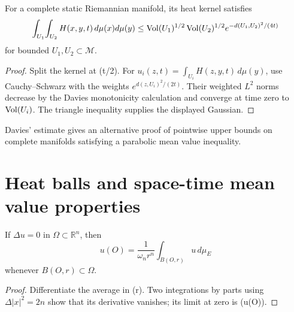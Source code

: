 \begin{theorem}
\label{thm:chow-iii-davies-double-integral-upper-bound}


For a complete static Riemannian manifold, its heat kernel satisfies
\[
 \int_{U_1}\!\int_{U_2}H(x,y,t)\,d\mu(x)d\mu(y)
 \le \operatorname{Vol}(U_1)^{1/2}\operatorname{Vol}(U_2)^{1/2}
 e^{-d(U_1,U_2)^2/(4t)}
\]
for bounded \(U_1,U_2\subset\mathcal M\).
\end{theorem}
\begin{proof}
\sketch Split the kernel at (t/2).  For
\(u_i(z,t)=\int_{U_i}H(z,y,t)\,d\mu(y)\), use Cauchy--Schwarz with the
weights \(e^{d(z,U_i)^2/(2t)}\).  Their weighted \(L^2\) norms decrease by
the Davies monotonicity calculation and converge at time zero to
\(\operatorname{Vol}(U_i)\).  The triangle inequality supplies the displayed Gaussian.
\end{proof}

\begin{remark}
\label{rem:chow-iii-davies-estimate-pointwise-use}


Davies' estimate gives an alternative proof of pointwise upper bounds on
complete manifolds satisfying a parabolic mean value inequality.
\end{remark}

\section{Heat balls and space-time mean value properties}

\begin{theorem}
\label{thm:chow-iii-euclidean-harmonic-mean-value-property}

If \(\Delta u=0\) in \(\Omega\subset\mathbb R^n\), then
\[
 u(O)=\frac1{\omega_nr^n}\int_{B(O,r)}u\,d\mu_E
\]
whenever \(B(O,r)\subset\Omega\).
\end{theorem}
\begin{proof}
\sketch Differentiate the average in (r).  Two integrations by parts using
\(\Delta|x|^2=2n\) show that its derivative vanishes; its limit at zero is
(u(O)).
\end{proof}

